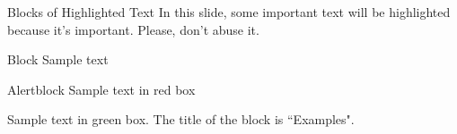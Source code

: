 \documentclass[aspectratio=169,xcolor=dvipsnames, t]{beamer}
\begin{document}
    \begin{frame}{Blocks of Highlighted Text}
        In this slide, some important text will be \alert{highlighted} because it's important. Please, don't abuse it.
        
        \begin{block}{Block}
            Sample text
        \end{block}
        
        \begin{alertblock}{Alertblock}
            Sample text in red box
        \end{alertblock}
        
        \begin{examples}
            Sample text in green box. The title of the block is ``Examples".
        \end{examples}
    \end{frame}
\end{document}
